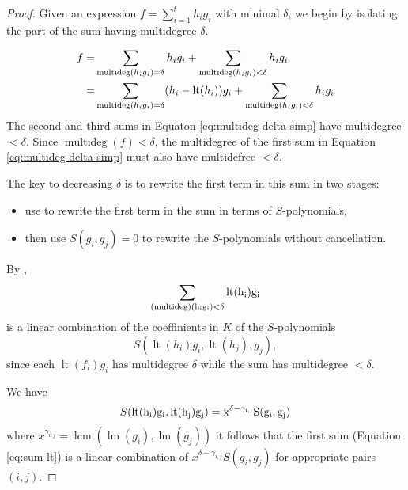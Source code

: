 \documentclass[
]{book}
\providecommand{\tightlist}{%
  \setlength{\itemsep}{0pt}\setlength{\parskip}{0pt}}
\theoremstyle{definition}
\theoremstyle{definition}
\theoremstyle{definition}
\theoremstyle{definition}
\theoremstyle{remark}
\begin{document}
\begin{proof}
Given an expression \(f = \sum^t_{i=1} h_i g_i\) with minimal \(\delta\), we begin by isolating the part of the sum having multidegree \(\delta\).

\begin{align}
f=&\sum_{{\rm multideg}(h_{i}g_{i})=\delta}h_{i}g_{i}+\sum_{{\rm multideg}(h_{i}g_{i})<\delta}h_{i}g_{i}\\
=&\sum_{{\rm multideg}(h_{i}g_{i})=\delta}(h_{i}-{\rm lt}(h_{i}))g_{i}+\sum_{{\rm multideg}(h_{i}g_{i})<\delta}h_{i}g_{i} \label{eq:multideg-delta-simp}
\end{align}
The second and third sums in Equaton \eqref{eq:multideg-delta-simp} have multidegree \(< \delta\). Since \(\operatorname{multideg}(f) < \delta\), the multidegree of the first sum in Equation \eqref{eq:multideg-delta-simp} must also have multidefree \(< \delta\).

The key to decreasing \(\delta\) is to rewrite the first term in this sum in two stages:

\begin{itemize}
\tightlist
\item
  use \citep[Lemma 5]{cox2013} to rewrite the first term in the sum in terms of \(S\)-polynomials,
\item
  then use \(S(g_i,g_j) = 0\) to rewrite the \(S\)-polynomials without cancellation.
\end{itemize}

By \citep[Lemma 5]{cox2013},
\[
\sum_{\rm(multideg)(h_i g_i) < \delta} \rm{lt}(h_i) g_i
\]
is a linear combination of the coeffinients in \(K\) of the \(S\)-polynomials
\[
S(\operatorname{lt}(h_i) g_i, \operatorname{lt}(h_j), g_j),
\]
since each \(\operatorname{lt}(f_i) g_i\) has multidegree \(\delta\) while the sum has multidegree \(< \delta\).

We have
\begin{equation}
\label{eq:sum-lt}
S(\rm{lt}(h_i) g_i, \rm{lt}(h_j) g_j) = x^{\delta - \gamma_{i,j}} S(g_i,g_j)
\end{equation}
where
\(x^{\gamma_{i,j}} = \operatorname{lcm}( \operatorname{lm}(g_i), \operatorname{lm}(g_j))\) it follows that the first sum (Equation \eqref{eq:sum-lt}) is a linear combination of \(x^{\delta - \gamma_{i,j}} S(g_i,g_j)\) for appropriate pairs \((i,j)\).


\end{proof}
\end{document}
